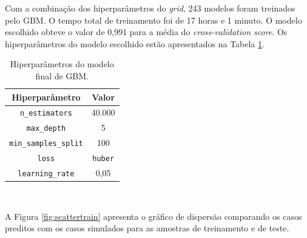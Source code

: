 \documentclass{article}
\begin{document}
Com a combinação dos hiperparâmetros do \textit{grid}, 243 modelos foram treinados pelo GBM.
O tempo total de treinamento foi de 17 horas e 1 minuto.
O modelo escolhido obteve o valor de 0,991 para a média do \textit{cross-validation score}. Os hiperparâmetros do modelo escolhido estão apresentados na Tabela \ref{table:bestr2}.

\begin{table}[!htb]
	\centering
	\caption{Hiperparâmetros do modelo final de GBM.}
	\label{table:bestr2}
	\begin{tabular}{|c |c |}
		\hline
		\textbf{Hiperparâmetro} & \textbf{Valor} \\
		\hline
		\texttt{n\_estimators} & 40.000 \\
		\hline
		\texttt{max\_depth} & 5 \\
		\hline
		\texttt{min\_samples\_split} & 100 \\
		\hline
		\texttt{loss} & \texttt{huber} \\
		\hline
		\texttt{learning\_rate} & 0,05 \\
		\hline
	\end{tabular}\\
\end{table}

A Figura \ref{fig:scattertrain} apresenta o gráfico de dispersão comparando os casos preditos com os casos simulados para as amostras de treinamento e de teste. 
\end{document}
